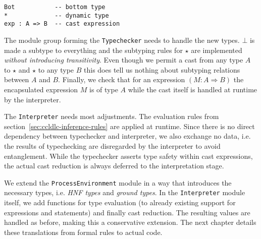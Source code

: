 \begin{lstlisting}[float,language=ldgv,
  caption=LDGV: New language constructs for CCLDLC,
  label=lst:ccldlc-grammar]
Bot           -- bottom type
*             -- dynamic type
exp : A => B  -- cast expression
\end{lstlisting}

The module group forming the \texttt{Typechecker} needs to handle the new types. $\bot$ is made a subtype to everything and the subtyping rules for $\star$ are implemented \emph{without introducing transitivity}. Even though we permit a cast from any type $A$ to $\star$ and $\star$ to any type $B$ this does tell us nothing about subtyping relations between $A$ and $B$. Finally, we check that for an expression $(M : A \Rightarrow B)$ the encapsulated expression $M$ is of type $A$ while the cast itself is handled at runtime by the interpreter.

The \texttt{Interpreter} needs most adjustments. The evaluation rules from section~\ref{sec:ccldlc-inference-rules} are applied at runtime. Since there is no direct dependency between typechecker and interpreter, we also exchange no data, i.e. the results of typechecking are disregarded by the interpreter to avoid entanglement. While the typechecker asserts type safety within cast expressions, the actual cast reduction is always deferred to the interpretation stage.

We extend the \texttt{ProcessEnvironment} module in a way that introduces the necessary types, i.e. \emph{HNF types} and \emph{ground types}. In the \texttt{Interpreter} module itself, we add functions for type evaluation (to already existing support for expressions and statements) and finally cast reduction. The resulting values are handled as before, making this a conservative extension. The next chapter details these translations from formal rules to actual code.
